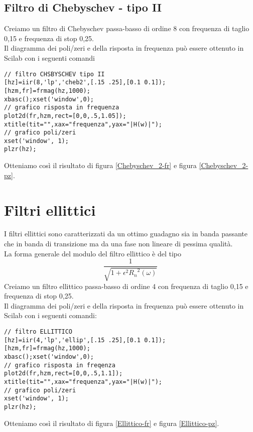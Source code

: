 \subsection{Filtro di Chebyschev - tipo II}
Creiamo un filtro di Chebyschev passa-basso di ordine 8 con frequenza di taglio 0,15 e frequenza di stop 0,25.\\
Il diagramma dei poli/zeri e della risposta in frequenza pu\`o essere ottenuto in Scilab con i seguenti comandi
\begin{verbatim}
// filtro CHSBYSCHEV tipo II
[hz]=iir(8,'lp','cheb2',[.15 .25],[0.1 0.1]);
[hzm,fr]=frmag(hz,1000);
xbasc();xset('window',0);
// grafico risposta in frequenza
plot2d(fr,hzm,rect=[0,0,.5,1.05]);
xtitle(tit="",xax="frequenza",yax="|H(w)|");
// grafico poli/zeri
xset('window', 1);
plzr(hz);
\end{verbatim}
Otteniamo cos\`i il risultato di figura \ref{Chebyschev_2-fr} e figura \ref{Chebyschev_2-pz}.



\section{Filtri ellittici}
I filtri ellittici sono caratterizzati da un ottimo guadagno sia in banda passante che in banda di transizione ma da una fase non lineare di pessima qualit\`a.\\
La forma generale del modulo del filtro ellittico \`e del tipo
\begin{displaymath}
\frac{1}{\sqrt{1+\epsilon^2{R_n}^2(\omega)}}
\end{displaymath}
Creiamo un filtro ellittico passa-basso di ordine 4 con frequenza di taglio 0,15 e frequenza di stop 0,25.\\
Il diagramma dei poli/zeri e della risposta in frequenza pu\`o essere ottenuto in Scilab con i seguenti comandi:
\begin{verbatim}
// filtro ELLITTICO
[hz]=iir(4,'lp','ellip',[.15 .25],[0.1 0.1]);
[hzm,fr]=frmag(hz,1000);
xbasc();xset('window',0);
// grafico risposta in freqenza
plot2d(fr,hzm,rect=[0,0,.5,1.1]);
xtitle(tit="",xax="frequenza",yax="|H(w)|");
// grafico poli/zeri
xset('window', 1);
plzr(hz);
\end{verbatim}
Otteniamo cos\`i il risultato di figura \ref{Ellittico-fr} e figura \ref{Ellittico-pz}.\\

%
